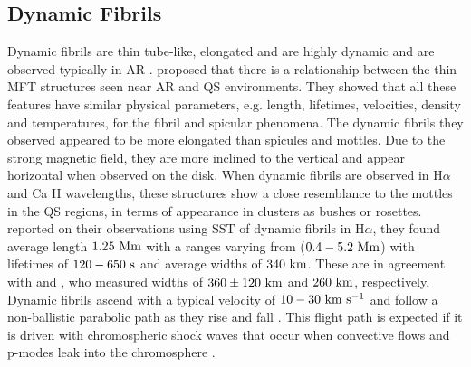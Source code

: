 \documentclass[12pt]{ociamthesis}
\newcommand{\kms}{~\rm{km ~s^{-1}}}
\newcommand{\np}{\\ \\}
\begin{document}
\subsection{Dynamic Fibrils}
\label{subsec:dfibs}
Dynamic fibrils are thin tube-like, elongated and are highly dynamic and are observed typically in AR \citep{De_Pontieu2007ApJ,Hansteen2006ApJ}. \cite{Foukal1971SoPh1959F,Foukal1971SoPh20298F} proposed that there is a relationship between the thin MFT structures seen near AR and QS environments. They showed that all these features have similar physical parameters, e.g. length, lifetimes, velocities, density and temperatures, for the fibril and spicular phenomena. The dynamic fibrils they observed appeared to be more elongated than spicules and mottles. Due to the strong magnetic field, they are more inclined to the vertical and appear horizontal when observed on the disk. When dynamic fibrils are observed in H$\alpha$ and Ca II wavelengths, these structures show a close resemblance to the mottles in the QS regions, in terms of appearance in clusters as bushes or rosettes. \cite{De_Pontieu2007ApJ} reported on their observations using SST of dynamic fibrils in H$\alpha$, they found average length $1.25~\rm{Mm}$ with a ranges varying from ($0.4-5.2~\rm{Mm}$) with lifetimes of $120-650~\rm{s}$ and average widths of $340~\rm{km}$. These are in agreement with \cite{Morton2012NatCo31315M} and \cite{Gafeira2017ApJS2297G}, who measured widths of $360\pm120~\rm{km}$ and $260~\rm{km}$, respectively. Dynamic fibrils ascend with a typical velocity of $10-30\kms$ and follow a non-ballistic parabolic path as they rise and fall \cite{Beckers1968}. This flight path is expected if it is driven with chromospheric shock waves that occur when convective flows and p-modes leak into the chromosphere \citep{Langangen2008ApJ6731194L,De_Pontieu2007ApJ}. \np
\end{document}
